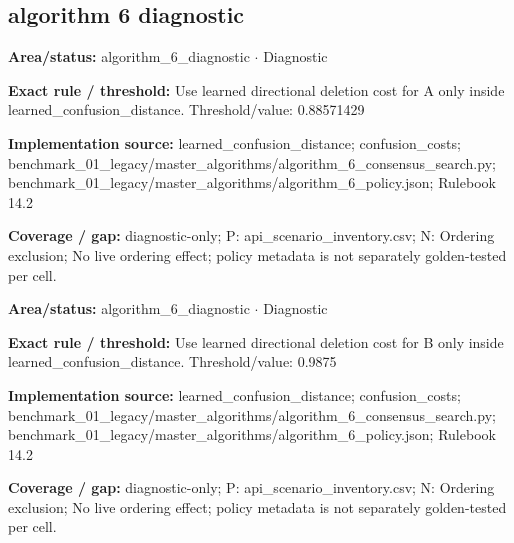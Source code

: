 \subsection*{algorithm 6 diagnostic}
\begin{tcolorbox}[enhanced,breakable,colback=white,colframe=Muted!45,boxrule=0.45pt,arc=1.5pt,left=6pt,right=6pt,top=5pt,bottom=5pt,title={\texttt{A6-LEARNED-DELETION-A}},title after break={\texttt{A6-LEARNED-DELETION-A}\ (continued)},fonttitle=\headingfont\bfseries\color{Navy},coltitle=Navy]
\textbf{Area/status:} algorithm\_\allowbreak{}6\_\allowbreak{}diagnostic $\boldsymbol{\cdot}$ Diagnostic\par
\smallskip
\textbf{Exact rule / threshold:} Use learned directional deletion cost for A only inside learned\_\allowbreak{}confusion\_\allowbreak{}distance. Threshold/\allowbreak{}value: 0.88571429\par
\smallskip
\textbf{Implementation source:} learned\_\allowbreak{}confusion\_\allowbreak{}distance; confusion\_\allowbreak{}costs; benchmark\_\allowbreak{}01\_\allowbreak{}legacy/\allowbreak{}master\_\allowbreak{}algorithms/\allowbreak{}algorithm\_\allowbreak{}6\_\allowbreak{}consensus\_\allowbreak{}search.py; benchmark\_\allowbreak{}01\_\allowbreak{}legacy/\allowbreak{}master\_\allowbreak{}algorithms/\allowbreak{}algorithm\_\allowbreak{}6\_\allowbreak{}policy.json; Rulebook 14.2\par
\smallskip
\textbf{Coverage / gap:} diagnostic-only; P: api\_\allowbreak{}scenario\_\allowbreak{}inventory.csv; N: Ordering exclusion; No live ordering effect; policy metadata is not separately golden-tested per cell.
\end{tcolorbox}
\begin{tcolorbox}[enhanced,breakable,colback=white,colframe=Muted!45,boxrule=0.45pt,arc=1.5pt,left=6pt,right=6pt,top=5pt,bottom=5pt,title={\texttt{A6-LEARNED-DELETION-B}},title after break={\texttt{A6-LEARNED-DELETION-B}\ (continued)},fonttitle=\headingfont\bfseries\color{Navy},coltitle=Navy]
\textbf{Area/status:} algorithm\_\allowbreak{}6\_\allowbreak{}diagnostic $\boldsymbol{\cdot}$ Diagnostic\par
\smallskip
\textbf{Exact rule / threshold:} Use learned directional deletion cost for B only inside learned\_\allowbreak{}confusion\_\allowbreak{}distance. Threshold/\allowbreak{}value: 0.9875\par
\smallskip
\textbf{Implementation source:} learned\_\allowbreak{}confusion\_\allowbreak{}distance; confusion\_\allowbreak{}costs; benchmark\_\allowbreak{}01\_\allowbreak{}legacy/\allowbreak{}master\_\allowbreak{}algorithms/\allowbreak{}algorithm\_\allowbreak{}6\_\allowbreak{}consensus\_\allowbreak{}search.py; benchmark\_\allowbreak{}01\_\allowbreak{}legacy/\allowbreak{}master\_\allowbreak{}algorithms/\allowbreak{}algorithm\_\allowbreak{}6\_\allowbreak{}policy.json; Rulebook 14.2\par
\smallskip
\textbf{Coverage / gap:} diagnostic-only; P: api\_\allowbreak{}scenario\_\allowbreak{}inventory.csv; N: Ordering exclusion; No live ordering effect; policy metadata is not separately golden-tested per cell.
\end{tcolorbox}
